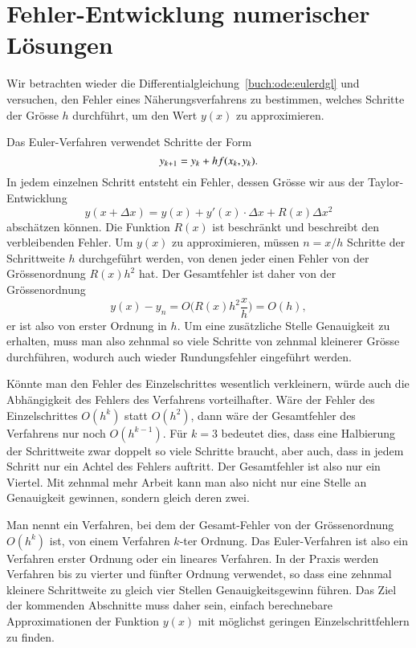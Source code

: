 %
%
%
\section{Fehler-Entwicklung numerischer Lösungen}
Wir betrachten wieder die Differentialgleichung~\eqref{buch:ode:eulerdgl}
und versuchen, den Fehler eines Näherungsverfahrens zu bestimmen,
welches Schritte der Grösse $h$ durchführt, um den Wert $y(x)$
zu approximieren.

Das Euler-Verfahren verwendet Schritte der Form
\[
y_{k+1}=y_{k\mathstrut} + hf(x_{k\mathstrut},y_{k\mathstrut}).
\]
In jedem einzelnen Schritt entsteht ein Fehler, dessen Grösse wir
aus der Taylor-Entwicklung
\[
y(x+\Delta x)=
y(x) + y'(x)\cdot \Delta x + R(x) \Delta x^2
\]
abschätzen können.
Die Funktion $R(x)$ ist beschränkt und beschreibt den verbleibenden
Fehler.
Um $y(x)$ zu approximieren, müssen $n=x/h$ Schritte der Schrittweite
$h$ durchgeführt werden, von denen jeder einen Fehler
von der Grössenordnung $R(x)h^2$ hat.
Der Gesamtfehler ist daher von der Grössenordnung
\[
y(x)-y_n=O\biggl(R(x)h^2\frac{x}h\biggr)=O(h),
\]
er ist also von erster Ordnung in $h$.
Um eine zusätzliche Stelle Genauigkeit zu erhalten, muss man also zehnmal
so viele Schritte von zehnmal kleinerer Grösse durchführen,
wodurch auch wieder Rundungsfehler eingeführt werden.

Könnte man den Fehler des Einzelschrittes wesentlich verkleinern, würde
auch die Abhängigkeit des Fehlers des Verfahrens vorteilhafter.
Wäre der Fehler des Einzelschrittes $O(h^k)$ statt $O(h^2)$, dann
wäre der Gesamtfehler des Verfahrens nur noch $O(h^{k-1})$.
Für $k=3$ bedeutet dies, dass eine Halbierung der Schrittweite
zwar doppelt so viele Schritte braucht, aber auch, dass in jedem
Schritt nur ein Achtel des Fehlers auftritt.
Der Gesamtfehler ist also nur ein Viertel.
Mit zehnmal mehr Arbeit kann man also nicht nur eine Stelle an
Genauigkeit gewinnen, sondern gleich deren zwei.

Man nennt ein Verfahren, bei dem der Gesamt-Fehler von der Grössenordnung
$O(h^k)$ ist, von einem Verfahren $k$-ter Ordnung.
%
Das Euler-Verfahren ist also ein Verfahren erster Ordnung oder ein
lineares Verfahren.
In der Praxis werden Verfahren bis zu vierter und fünfter Ordnung
verwendet, so dass eine zehnmal kleinere Schrittweite zu gleich
vier Stellen Genauigkeitsgewinn führen.
Das Ziel der kommenden Abschnitte muss daher sein, einfach
berechnebare Approximationen der Funktion $y(x)$ mit möglichst geringen
Einzelschrittfehlern zu finden.

